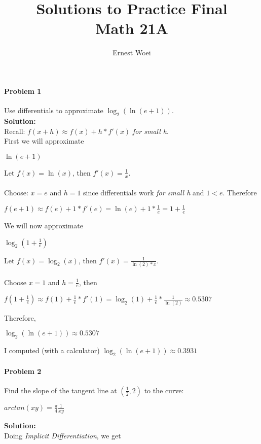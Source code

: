 \documentclass[a4paper,11pt]{article}
\title{Solutions to Practice Final \\ Math 21A}
\author{Ernest Woei}
\begin{document}
\maketitle

\paragraph{Problem 1} Use differentials to approximate $\log_2(\ln(e+1))$. \\
\textbf{Solution:} \\
Recall: $f(x+h) \approx f(x) + h*f ' (x)$ \emph{for small h}. \\
First we will approximate
\begin{center}
$\ln(e+1)$
\end{center}
Let $f(x)=\ln(x)$, then $f'(x)=\frac{1}{x}$. \\ \\
Choose: $x = e$ and $h = 1$ since differentials work \emph{for small h} and $1 < e$.  Therefore 
\begin{center}
$f(e+1) \approx f(e) + 1*f'(e) = \ln(e) + 1*\frac{1}{e} = 1 + \frac{1}{e}$
\end{center}
We will now approximate
\begin{center}$\log_2(1+\frac{1}{e})$\end{center}
Let $f(x) = \log_2(x)$, then $f'(x) = \frac{1}{\ln(2)*x}$. \\ \\
Choose $x = 1$ and $h = \frac{1}{e}$, then
\begin{center}$f(1+\frac{1}{e}) \approx f(1) + \frac{1}{e}*f ' (1) = \log_2(1) + \frac{1}{e}*\frac{1}{\ln(2)} \approx 0.5307$\end{center}
Therefore,
\begin{center}$\log_2(\ln(e+1)) \approx 0.5307$\end{center}
I computed (with a calculator) $\log_2(\ln(e+1)) \approx 0.3931$

\newpage
\paragraph{Problem 2} Find the slope of the tangent line at $(\frac{1}{2}, 2)$ to the curve:

\begin{center}$arctan(xy) = \frac{\pi}{4}\frac{1}{xy}$\end{center}
\textbf{Solution:} \\
Doing \emph{Implicit Differentiation}, we get 
\end{document}
